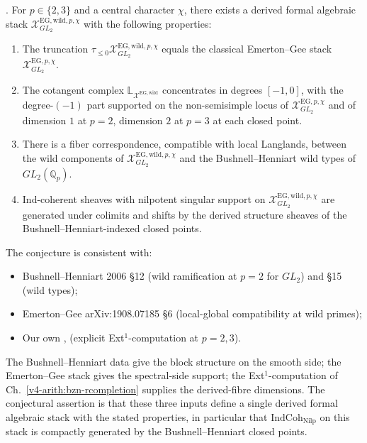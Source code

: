 \begin{conjecture}
\label{v4-arith:deg-f1a:conj:EG-wild-enhancement}
\ClaimStatusConjectured. For \(p\in\{2,3\}\) and a central character
\(\chi\), there exists a derived formal algebraic stack
\(\mathcal{X}^{\mathrm{EG,wild},p,\chi}_{GL_{2}}\) with the following
properties:
\begin{enumerate}
\item The truncation
\(\tau_{\leq 0}\mathcal{X}^{\mathrm{EG,wild},p,\chi}_{GL_{2}}\) equals
the classical Emerton--Gee stack
\(\mathcal{X}^{\mathrm{EG},p,\chi}_{GL_{2}}\).
\item The cotangent complex \(\mathbb{L}_{\mathcal{X}^{\mathrm{EG,wild}}}\)
concentrates in degrees \([-1,0]\), with the degree-\((-1)\) part
supported on the non-semisimple locus of
\(\mathcal{X}^{\mathrm{EG},p,\chi}_{GL_{2}}\) and of dimension \(1\) at
\(p=2\), dimension \(2\) at \(p=3\) at each closed point.
\item There is a fiber correspondence, compatible with local
Langlands, between the wild components of
\(\mathcal{X}^{\mathrm{EG,wild},p,\chi}_{GL_{2}}\) and the
Bushnell--Henniart wild types of \(GL_{2}(\mathbb{Q}_{p})\).
\item Ind-coherent sheaves with nilpotent singular support on
\(\mathcal{X}^{\mathrm{EG,wild},p,\chi}_{GL_{2}}\) are generated under
colimits and shifts by the derived structure sheaves of the
Bushnell--Henniart-indexed closed points.
\end{enumerate}
\end{conjecture}

\begin{remark}
\label{v4-arith:deg-f1a:rem:wild-EG-evidence}
The conjecture is consistent with:
\begin{itemize}
\item Bushnell--Henniart 2006 \S 12 (wild ramification at \(p=2\) for
\(GL_{2}\)) and \S 15 (wild types);
\item Emerton--Gee arXiv:1908.07185 \S 6 (local-global
compatibility at wild primes);
\item Our own ,
 (explicit
Ext\({}^{1}\)-computation at \(p=2,3\)).
\end{itemize}
The Bushnell--Henniart data give the block structure on the smooth
side; the Emerton--Gee stack gives the spectral-side support; the
Ext\({}^{1}\)-computation of Ch.~\ref{v4-arith:bzn-rcompletion} supplies
the derived-fibre dimensions. The conjectural assertion is that these
three inputs define a single derived formal algebraic stack with the
stated properties, in particular that
\(\mathrm{IndCoh}_{\mathrm{Nilp}}\) on this stack is compactly
generated by the Bushnell--Henniart closed points.
\end{remark}


